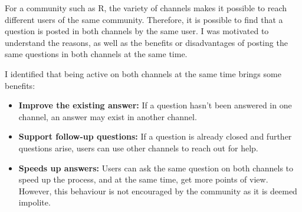 \documentclass{sig-alternate-05-2015}
\begin{document}
	For a community such as R, the variety of channels makes it possible to reach different users of the same community.
	Therefore, it is possible to find that a question is posted in both channels by the same user.
	I was motivated to understand the reasons, as well as the benefits or disadvantages of posting the same questions in both channels at the same time.

	I identified that being active on both channels at the same time brings some benefits:
	\begin{itemize}
		\item \textbf{Improve the existing answer:} If a question hasn't been answered in one channel, an answer may exist in another channel.
		\item \textbf{Support follow-up questions:} If a question is already closed and further questions arise, users can use other channels to reach out for help.
		\item \textbf{Speeds up answers:} Users can ask the same question on both channels to speed up the process, and at the same time, get more points of view. However, this behaviour is not encouraged by the community as it is deemed impolite.
	\end{itemize}




\end{document}
